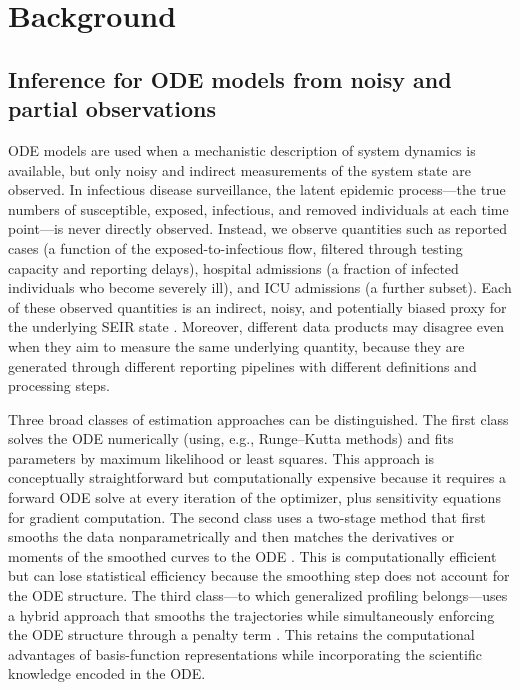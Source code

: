 \documentclass[11pt]{article}
\begin{document}
\section{Background}\label{sec:background}

\subsection{Inference for ODE models from noisy and partial observations}

ODE models are used when a mechanistic description of system dynamics is available, but only noisy and indirect measurements of the system state are observed. In infectious disease surveillance, the latent epidemic process---the true numbers of susceptible, exposed, infectious, and removed individuals at each time point---is never directly observed. Instead, we observe quantities such as reported cases (a function of the exposed-to-infectious flow, filtered through testing capacity and reporting delays), hospital admissions (a fraction of infected individuals who become severely ill), and ICU admissions (a further subset). Each of these observed quantities is an indirect, noisy, and potentially biased proxy for the underlying SEIR state \citep{Gostic2020,McGough2020}. Moreover, different data products may disagree even when they aim to measure the same underlying quantity, because they are generated through different reporting pipelines with different definitions and processing steps.

Three broad classes of estimation approaches can be distinguished. The first class solves the ODE numerically (using, e.g., Runge--Kutta methods) and fits parameters by maximum likelihood or least squares. This approach is conceptually straightforward but computationally expensive because it requires a forward ODE solve at every iteration of the optimizer, plus sensitivity equations for gradient computation. The second class uses a two-stage method that first smooths the data nonparametrically and then matches the derivatives or moments of the smoothed curves to the ODE \citep{Liang2008}. This is computationally efficient but can lose statistical efficiency because the smoothing step does not account for the ODE structure. The third class---to which generalized profiling belongs---uses a hybrid approach that smooths the trajectories while simultaneously enforcing the ODE structure through a penalty term \citep{Ramsay2007,Hooker2016}. This retains the computational advantages of basis-function representations while incorporating the scientific knowledge encoded in the ODE.
\end{document}
